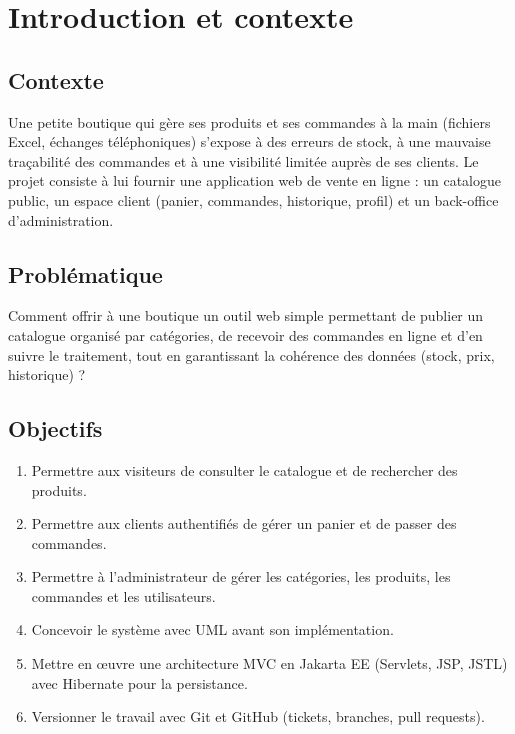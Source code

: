 \chapter{Introduction et contexte}

\section{Contexte}

Une petite boutique qui gère ses produits et ses commandes à la main (fichiers Excel, échanges
téléphoniques) s'expose à des erreurs de stock, à une mauvaise traçabilité des commandes et à une
visibilité limitée auprès de ses clients. Le projet consiste à lui fournir une application web de vente en
ligne : un catalogue public, un espace client (panier, commandes, historique, profil) et un back-office
d'administration.

\section{Problématique}

Comment offrir à une boutique un outil web simple permettant de publier un catalogue organisé par
catégories, de recevoir des commandes en ligne et d'en suivre le traitement, tout en garantissant la
cohérence des données (stock, prix, historique) ?

\section{Objectifs}

\begin{enumerate}
  \item Permettre aux visiteurs de consulter le catalogue et de rechercher des produits.
  \item Permettre aux clients authentifiés de gérer un panier et de passer des commandes.
  \item Permettre à l'administrateur de gérer les catégories, les produits, les commandes et les utilisateurs.
  \item Concevoir le système avec UML avant son implémentation.
  \item Mettre en œuvre une architecture MVC en Jakarta EE (Servlets, JSP, JSTL) avec Hibernate pour la persistance.
  \item Versionner le travail avec Git et GitHub (tickets, branches, pull requests).
\end{enumerate}

